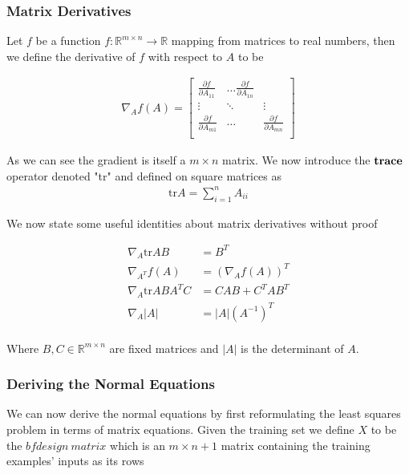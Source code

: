 \documentclass[11pt]{exam}
\begin{document}
\subsubsection{Matrix Derivatives}

Let $f$ be a function $f : \mathbb{R}^{m \times n} \rightarrow \mathbb{R}$ mapping from matrices to real numbers, then we define the derivative of $f$ with respect to $A$ to be 

\begin{align*}
\nabla_Af(A) = \begin{bmatrix}
\frac{\partial f}{\partial A_{11}} & \dots \frac{\partial f}{\partial A_{1n}}\\
\vdots & \ddots & \vdots\\
\frac{\partial f}{\partial A_{m1}} & \dots & \frac{\partial f}{\partial A_{mn}}\\
\end{bmatrix}
\end{align*}

As we can see the gradient is itself a $m \times n$ matrix. 
We now introduce the $\bf{trace}$ operator denoted "tr" and defined on square matrices as 
\begin{align*}
\text{tr}A = \sum_{i=1}^n A_{ii}
\end{align*}

We now state some useful identities about matrix derivatives without proof

\begin{align*}
\nabla_A \text{tr}AB &= B^T\\
\nabla_{A^T} f(A) &= (\nabla_{A} f(A))^T\\
\nabla_A \text{tr}ABA^TC &= CAB + C^TAB^T\\
\nabla_A |A| &= |A|(A^{-1})^T\\
\end{align*}

Where $B,C \in \mathbb{R}^{m \times n}$ are fixed matrices and  $|A|$ is the determinant of $A$.

\subsubsection{Deriving the Normal Equations}

We can now derive the normal equations by first reformulating the least squares problem in terms of matrix equations.
Given the training set we define $X$ to be the $bf{design \ matrix}$ which is an $m \times n + 1$ matrix containing the training examples' inputs as its rows
\end{document}
